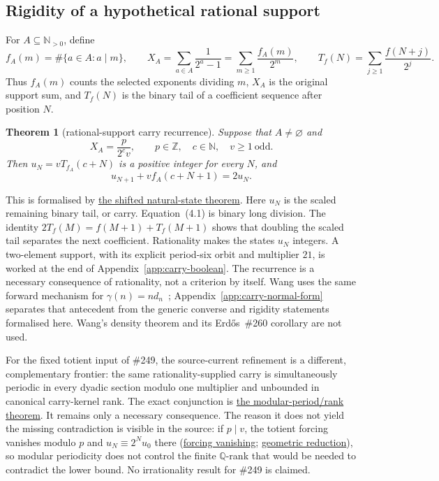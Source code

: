 \documentclass[11pt]{article}
\newcommand{\commit}{bb4e24651b37cd096d3749ef299c3317930b3a3b}
\newcommand{\repobase}{https://github.com/wcook04/plectis-lean-erdos249-257/blob/\commit}
\newcommand{\PK}{Erdos249257}
\newcommand{\lword}[4]{\href{\repobase/\PK/#1\#L#2}{#4}}
\newtheorem{theorem}{Theorem}[section]
\theoremstyle{definition}
\theoremstyle{remark}
\newcommand{\N}{\mathbb{N}}
\newcommand{\Npos}{\mathbb{N}_{>0}}
\newcommand{\Z}{\mathbb{Z}}
\begin{document}
\subsection{Rigidity of a hypothetical rational support}

For \(A\subseteq\Npos\), define
\[
 f_A(m)=\#\{a\in A:a\mid m\},
 \qquad
 X_A=\sum_{a\in A}\frac1{2^a-1}
     =\sum_{m\geq1}\frac{f_A(m)}{2^m},
 \qquad
 T_f(N)=\sum_{j\geq1}\frac{f(N+j)}{2^j}.
\]
Thus \(f_A(m)\) counts the selected exponents dividing \(m\), \(X_A\) is the
original support sum, and \(T_f(N)\) is the binary tail of a coefficient
sequence after position \(N\).

\begin{theorem}[rational-support carry recurrence]\label{res:rigidity-main}
Suppose that \(A\neq\varnothing\) and
\[
 X_A=\frac{p}{2^c v},
 \qquad p\in\Z,\quad c\in\N,\quad v\geq1\ \text{odd}.
\]
Then \(u_N=vT_{f_A}(c+N)\) is a positive integer for every \(N\), and
\[
 u_{N+1}+v f_A(c+N+1)=2u_N. \tag{4.1}
\]
\end{theorem}
\noindent This is formalised by
\lword{RationalSupportCarrySkeleton.lean}{671}{exists_shifted_odd_tail_nat_states_of_support_fraction}{the shifted natural-state theorem}.
Here \(u_N\) is the scaled remaining binary tail, or carry.
Equation~\textup{(4.1)} is binary long division.  The identity
\(2T_f(M)=f(M+1)+T_f(M+1)\) shows that doubling the scaled tail separates the
next coefficient.  Rationality makes the states \(u_N\) integers.
A two-element
support, with its explicit period-six orbit and multiplier \(21\), is worked
at the end of Appendix~\ref{app:carry-boolean}.
The recurrence is a necessary consequence of rationality, not a criterion by
itself.  Wang uses the same forward mechanism for
\(\gamma(n)=n d_n\)~\cite[Proposition~3.1, pp.~5--6]{wang2026};
Appendix~\ref{app:carry-normal-form}
separates that antecedent from the generic converse and rigidity statements
formalised here.  Wang's density theorem and its Erd\H{o}s~\#260 corollary
are not used.

For the fixed totient input of \#249, the source-current refinement is a
different, complementary frontier: the same rationality-supplied carry is
simultaneously periodic in every dyadic section modulo one multiplier and
unbounded in canonical carry-kernel rank.  The exact conjunction is
\lword{TotientTailCarryPeriod.lean}{224}{not_irrational_totientSeries_implies_mod_period_and_unbounded_rank}{the modular-period/rank theorem}.
It remains only a necessary consequence.  The reason it does not yield the
missing contradiction is visible in the source: if $p\mid v$, the totient
forcing vanishes modulo $p$ and $u_N\equiv2^N u_0$ there
(\lword{TotientTailCarryPeriod.lean}{126}{totient_forcing_vanishes_mod_of_dvd_multiplier}{forcing vanishing};
\lword{TotientTailCarryPeriod.lean}{140}{totient_carry_modEq_geometric_of_dvd_multiplier}{geometric reduction}),
so modular periodicity does not control the finite $\mathbb Q$-rank that would
be needed to contradict the lower bound.  No irrationality result for \#249 is
claimed.
\end{document}
